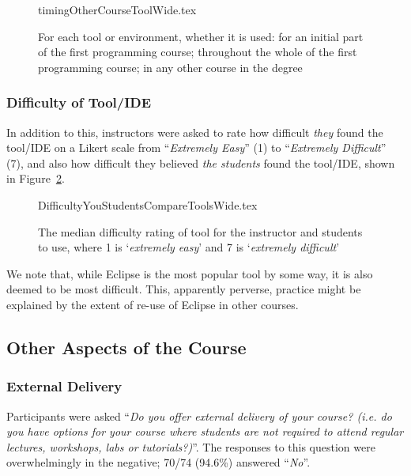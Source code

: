 \documentclass[english,submission]{programming}
\begin{document}
\begin{figure}
\begin{center}
{timingOtherCourseToolWide.tex}
\end{center}
\caption{For each tool or environment, whether it is used: for an initial part of the first programming course; throughout the whole of the first programming course; in any other course in the degree\label{fig:toolreuse}}
\end{figure}

\subsubsection{Difficulty of Tool/IDE}

In addition to this, instructors were asked to rate how difficult
{\emph{they}} found the tool/IDE on a Likert scale from
``{\emph{Extremely Easy}}'' (1) to ``{\emph{Extremely Difficult}}''
(7), and also how difficult they believed {\emph{the students}} found
the tool/IDE, shown in Figure~\ref{fig:toolhard}.

\begin{figure}
\begin{center}
{DifficultyYouStudentsCompareToolsWide.tex}
\end{center}
\caption{The median difficulty rating of tool for the instructor and students to use, where 1 is `{\emph{extremely easy}}' and 7 is `{\emph{extremely difficult}}'  %
\label{fig:toolhard}}
\end{figure}

We note that, while Eclipse is the most popular tool by some way, it
is also deemed to be most difficult. This, apparently perverse,
practice might be explained by the extent of re-use of Eclipse in
other courses.

\subsection{Other Aspects of the Course}

\subsubsection{External Delivery}

Participants were asked ``{\emph{Do you offer external delivery of
your course? (i.e. do you have options for your course where students
are not required to attend regular lectures, workshops, labs or
tutorials?)}}''. The responses to this question were overwhelmingly in
the negative; 70/74 (94.6\%) answered ``{\emph{No}}''.
\end{document}
